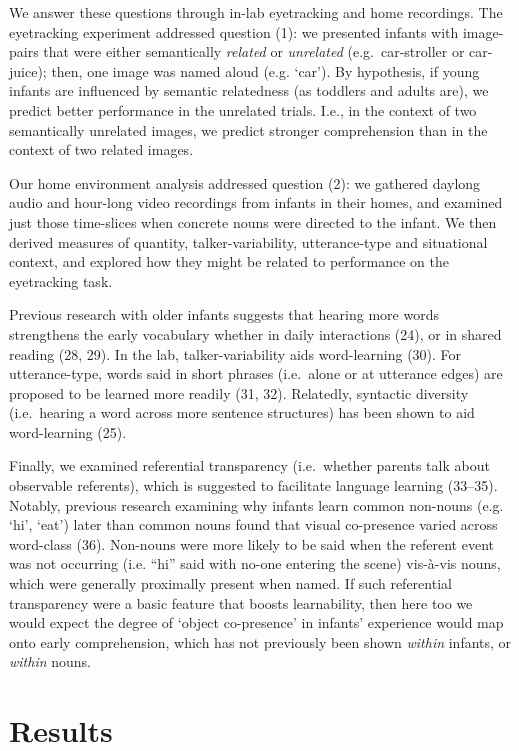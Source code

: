 \documentclass[9pt,twocolumn,twoside,]{pnas-new}
\begin{document}
We answer these questions through in-lab eyetracking and home
recordings. The eyetracking experiment addressed question (1): we
presented infants with image-pairs that were either semantically
\emph{related} or \emph{unrelated} (e.g.~car-stroller or car-juice);
then, one image was named aloud (e.g. `car'). By hypothesis, if young
infants are influenced by semantic relatedness (as toddlers and adults
are), we predict better performance in the unrelated trials. I.e., in
the context of two semantically unrelated images, we predict stronger
comprehension than in the context of two related images.

Our home environment analysis addressed question (2): we gathered
daylong audio and hour-long video recordings from infants in their
homes, and examined just those time-slices when concrete nouns were
directed to the infant. We then derived measures of quantity,
talker-variability, utterance-type and situational context, and explored
how they might be related to performance on the eyetracking task.

Previous research with older infants suggests that hearing more words
strengthens the early vocabulary whether in daily interactions (24), or
in shared reading (28, 29). In the lab, talker-variability aids
word-learning (30). For utterance-type, words said in short phrases
(i.e.~alone or at utterance edges) are proposed to be learned more
readily (31, 32). Relatedly, syntactic diversity (i.e.~hearing a word
across more sentence structures) has been shown to aid word-learning
(25).

Finally, we examined referential transparency (i.e.~whether parents talk
about observable referents), which is suggested to facilitate language
learning (33--35). Notably, previous research examining why infants
learn common non-nouns (e.g. `hi', `eat') later than common nouns found
that visual co-presence varied across word-class (36). Non-nouns were
more likely to be said when the referent event was not occurring (i.e.
``hi'' said with no-one entering the scene) vis-à-vis nouns, which were
generally proximally present when named. If such referential
transparency were a basic feature that boosts learnability, then here
too we would expect the degree of `object co-presence' in infants'
experience would map onto early comprehension, which has not previously
been shown \emph{within} infants, or \emph{within} nouns.

\section*{Results}\label{results}
\end{document}
